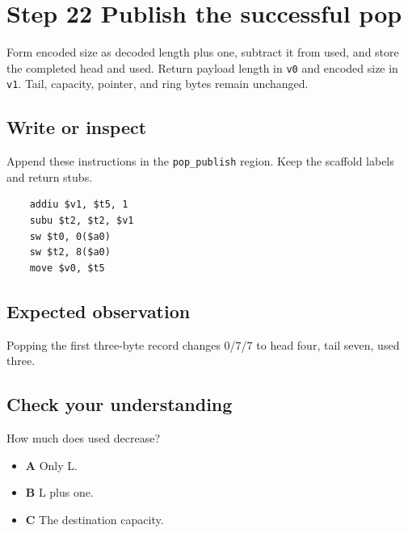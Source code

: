 \section{Step 22 Publish the successful pop}\label{ring-s22}

Form encoded size as decoded length plus one, subtract it from used, and store the completed head and used. Return payload length in \texttt{v0} and encoded size in \texttt{v1}. Tail, capacity, pointer, and ring bytes remain unchanged.

\subsection{Write or inspect}
Append these instructions in the \texttt{pop\_publish} region. Keep the scaffold labels and return stubs.

\begin{verbatim}
    addiu $v1, $t5, 1
    subu $t2, $t2, $v1
    sw $t0, 0($a0)
    sw $t2, 8($a0)
    move $v0, $t5
\end{verbatim}

\subsection{Expected observation}
Popping the first three-byte record changes 0/7/7 to head four, tail seven, used three.

\subsection{Check your understanding}
How much does used decrease?

\begin{itemize}
  \item \textbf{A} Only L.
  \item \textbf{B} L plus one.
  \item \textbf{C} The destination capacity.
\end{itemize}
